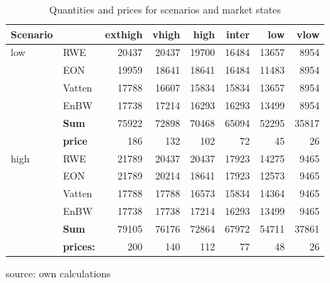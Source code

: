 \begin{table}
\centering
\caption{Quantities and prices for scenarios and market states}
\begin{tabular}{llrrrrrr}
\hline
\hline
  Scenario &            &    exthigh &      vhigh &       high &      inter &        low &       vlow \\
\hline
       low &        RWE &      20437 &      20437 &      19700 &      16484 &      13657 &       8954 \\

           &        EON &      19959 &      18641 &      18641 &      16484 &      11483 &       8954 \\

           &     Vatten &      17788 &      16607 &      15834 &      15834 &      13657 &       8954 \\

           &       EnBW &      17738 &      17214 &      16293 &      16293 &      13499 &       8954 \\
\hline
           &  {\bf Sum} &      75922 &      72898 &      70468 &      65094 &      52295 &      35817 \\

           & {\bf price} &        186 &        132 &        102 &         72 &         45 &         26 \\


\hline

      high &        RWE &      21789 &      20437 &      20437 &      17923 &      14275 &       9465 \\

           &        EON &      21789 &      20214 &      18641 &      17923 &      12573 &       9465 \\

           &     Vatten &      17788 &      17788 &      16573 &      15834 &      14364 &       9465 \\

           &       EnBW &      17738 &      17738 &      17214 &      16293 &      13499 &       9465 \\
           \hline
           &  {\bf Sum} &      79105 &      76176 &      72864 &      67972 &      54711 &      37861 \\

           & {\bf prices:} &        200 &        140 &        112 &         77 &         48 &         26 \\
\hline
\hline
\end{tabular}  

\label{tab:dynquant}
\begin{center}
source: own calculations
\end{center}
\end{table}


